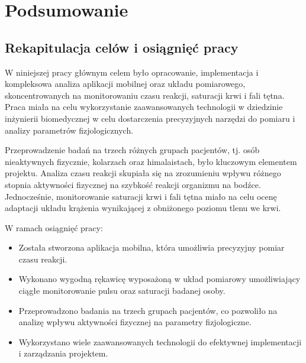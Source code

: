 \chapter{Podsumowanie}
\section{Rekapitulacja celów i osiągnięć pracy}
W niniejszej pracy głównym celem było opracowanie, implementacja i kompleksowa analiza aplikacji mobilnej oraz układu pomiarowego, skoncentrowanych na monitorowaniu czasu reakcji, saturacji krwi i fali tętna. Praca miała na celu wykorzystanie zaawansowanych technologii w dziedzinie inżynierii biomedycznej w celu dostarczenia precyzyjnych narzędzi do pomiaru i analizy parametrów fizjologicznych.

Przeprowadzenie badań na trzech różnych grupach pacjentów, tj. osób nieaktywnych fizycznie, kolarzach oraz himalaistach, było kluczowym elementem projektu. Analiza czasu reakcji skupiała się na zrozumieniu wpływu różnego stopnia aktywności fizycznej na szybkość reakcji organizmu na bodźce. Jednocześnie, monitorowanie saturacji krwi i fali tętna miało na celu ocenę adaptacji układu krążenia wynikającej z obniżonego poziomu tlenu we krwi.

W ramach osiągnięć pracy:
\begin{itemize}
    \item Została stworzona aplikacja mobilna, która umożliwia precyzyjny pomiar czasu reakcji.
    \item Wykonano wygodną rękawicę wyposażoną w układ pomiarowy umożliwiający ciągłe monitorowanie pulsu oraz saturacji badanej osoby.
    \item Przeprowadzono badania na trzech grupach pacjentów, co pozwoliło na analizę wpływu aktywności fizycznej na parametry fizjologiczne.
    \item Wykorzystano wiele zaawansowanych technologii do efektywnej implementacji i zarządzania projektem.
\end{itemize}
